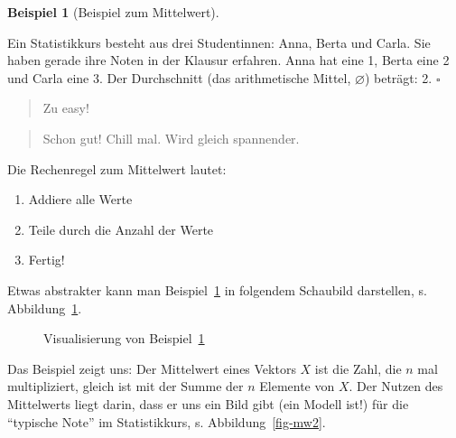 \documentclass[
  letterpaper,
  twoside,
  open=any]{scrbook}
\providecommand{\tightlist}{%
  \setlength{\itemsep}{0pt}\setlength{\parskip}{0pt}}\usepackage{longtable,booktabs,array}
\theoremstyle{definition}
\theoremstyle{definition}
\theoremstyle{definition}
\newtheorem{example}{Beispiel}[chapter]
\theoremstyle{remark}
\begin{document}
\begin{example}[Beispiel zum
Mittelwert]\protect\hypertarget{exm-mw}{}\label{exm-mw}

Ein Statistikkurs besteht aus drei Studentinnen: Anna, Berta und Carla.
Sie haben gerade ihre Noten in der Klausur erfahren. Anna hat eine 1,
Berta eine 2 und Carla eine 3. Der Durchschnitt (das arithmetische
Mittel, \(\varnothing\)) beträgt: 2. \(\square\)

\end{example}

\begin{quote}
{} Zu easy!
\end{quote}

\begin{quote}
{} Schon gut! Chill mal. Wird gleich spannender.
\end{quote}

Die Rechenregel zum Mittelwert lautet:

\begin{enumerate}
\def\labelenumi{\arabic{enumi}.}
\tightlist
\item
  Addiere alle Werte
\item
  Teile durch die Anzahl der Werte
\item
  Fertig!
\end{enumerate}

Etwas abstrakter kann man Beispiel~\ref{exm-mw} in folgendem Schaubild
darstellen, s. Abbildung~\ref{fig-eq-mw}.

\begin{figure}


\caption{\label{fig-eq-mw}Visualisierung von Beispiel~\ref{exm-mw}}

\end{figure}%

Das Beispiel zeigt uns: Der Mittelwert eines Vektors \(X\) ist die Zahl,
die \(n\) mal multipliziert, gleich ist mit der Summe der \(n\) Elemente
von \(X\). Der Nutzen des Mittelwerts liegt darin, dass er uns ein Bild
gibt (ein Modell ist!) für die \enquote{typische Note} im Statistikkurs,
s. Abbildung~\ref{fig-mw2}.
\end{document}
